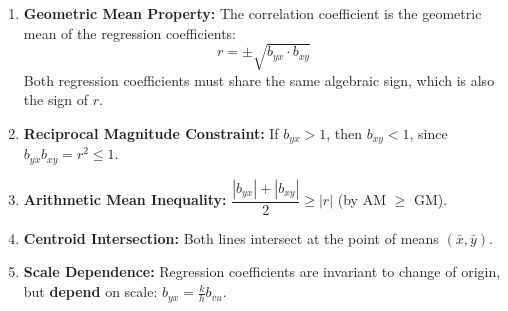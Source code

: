 \documentclass[12pt,a4paper]{article}
\begin{document}
\begin{tcolorbox}[formulabox, title={\textbf{Key Properties of Regression Coefficients}}]
\begin{enumerate}[leftmargin=*, itemsep=3pt]
  \item \textbf{Geometric Mean Property:} The correlation coefficient is the geometric mean of the regression coefficients:
  \begin{equation}
    r = \pm \sqrt{b_{yx} \cdot b_{xy}}
  \end{equation}
  Both regression coefficients must share the same algebraic sign, which is also the sign of $r$.
  \item \textbf{Reciprocal Magnitude Constraint:} If $b_{yx} > 1$, then $b_{xy} < 1$, since $b_{yx} b_{xy} = r^2 \le 1$.
  \item \textbf{Arithmetic Mean Inequality:} $\dfrac{|b_{yx}| + |b_{xy}|}{2} \ge |r|$ (by AM $\ge$ GM).
  \item \textbf{Centroid Intersection:} Both lines intersect at the point of means $(\bar{x}, \bar{y})$.
  \item \textbf{Scale Dependence:} Regression coefficients are invariant to change of origin, but \textbf{depend} on scale: $b_{yx} = \frac{k}{h} b_{vu}$.
\end{enumerate}
\end{tcolorbox}
\end{document}
